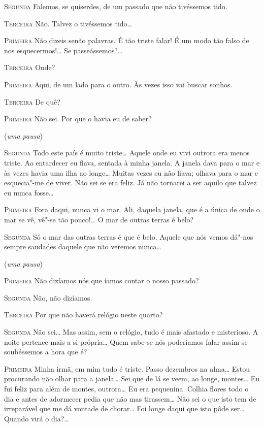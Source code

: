 \textsc{Segunda} Falemos, se quiserdes, de um passado
que não tivéssemos tido.

\textsc{Terceira} Não. Talvez o tivéssemos tido\ldots{}

\textsc{Primeira} Não dizeis senão palavras.
É tão triste falar! É um modo tão
falso de nos esquecermos!\ldots{} Se passeássemos?\ldots{}

\textsc{Terceira} Onde?

\textsc{Primeira} Aqui, de um lado para o outro. Às vezes isso vai buscar
sonhos.

\textsc{Terceira} De quê?

\textsc{Primeira} Não sei. Por que o havia eu de saber?

\hfill(\textit{uma pausa}) 

\textsc{Segunda} Todo este país é muito triste\ldots{} 
Aquele onde eu vivi outrora
era menos triste. Ao entardecer eu fiava, 
sentada à minha janela. A janela dava para o mar
e às vezes havia uma ilha ao longe\ldots{} Muitas
vezes eu não fiava; olhava para o mar e esquecia"-me
de viver. Não sei se era feliz. Já não tornarei a ser
aquilo que talvez eu nunca fosse\ldots{}

\textsc{Primeira} Fora daqui, nunca vi o mar.
Ali, daquela janela, que é a
única de onde o mar se vê, vê"-se tão pouco!\ldots{} 
O mar de outras terras é belo?

\textsc{Segunda} Só o mar das outras terras é que é belo.
Aquele que nós vemos
dá"-nos sempre saudades daquele que não veremos nunca\ldots{}

\hfill(\textit{uma pausa}) 

\textsc{Primeira} Não dizíamos nós que íamos contar o nosso passado?

\textsc{Segunda} Não, não dizíamos.

\textsc{Terceira} Por que não haverá relógio neste quarto?

\textsc{Segunda} Não sei\ldots{} Mas assim, sem o relógio,
tudo é mais afastado e
misterioso. A noite pertence mais a si própria\ldots{} 
Quem sabe se nós
poderíamos falar assim se soubéssemos a hora que é?

\textsc{Primeira} Minha irmã, em mim tudo é triste.
Passo dezembros na alma\ldots{}
Estou procurando não olhar para a janela\ldots{}
Sei que de lá se veem, ao longe, montes\ldots{}
Eu fui feliz para além de montes, outrora\ldots{} Eu era
pequenina. Colhia flores todo o dia e antes de 
adormecer pedia que não mas tirassem\ldots{}
Não sei o que isto tem de irreparável que me dá vontade
de chorar\ldots{} Foi longe daqui que isto pôde
ser\ldots{} Quando virá o dia?\ldots{}

